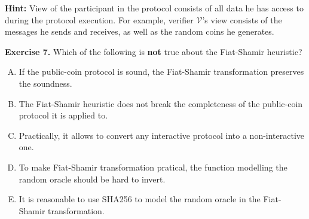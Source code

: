 \documentclass[../lecture-notes.tex]{subfiles}
\begin{document}
\textbf{Hint:} View of the participant in the protocol consists of all data he has access to during the protocol execution. For example, verifier $\mathcal{V}$'s view consists of the messages he sends and receives, as well as the random coins he generates.

\textbf{Exercise 7.} Which of the following is \textbf{not} true about the Fiat-Shamir heuristic?
\begin{enumerate}[(A)]
    \item If the public-coin protocol is sound, the Fiat-Shamir transformation preserves the soundness.
    \item The Fiat-Shamir heuristic does not break the completeness of the public-coin protocol it is applied to.
    \item Practically, it allows to convert any interactive protocol into a non-interactive one.
    \item To make Fiat-Shamir transformation pratical, the function modelling the random oracle should be hard to invert.
    \item It is reasonable to use SHA256 to model the random oracle in the Fiat-Shamir transformation.
\end{enumerate}
\end{document}
